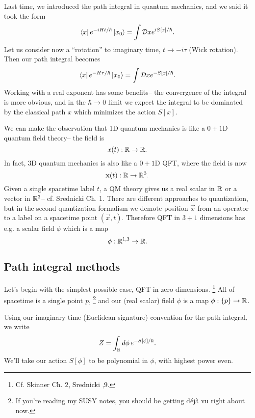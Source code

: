 Last time, we introduced the path integral in quantum mechanics, and we said it took the form
\begin{equation}
    \left< x \right|e^{-iHt/\hbar}\left| x_0 \right>=\int \mathcal{D} x e^{iS[x]/\hbar}.
\end{equation}
Let us consider now a ``rotation'' to imaginary time, $t\to - i\tau$ (Wick rotation). Then our path integral becomes
\begin{equation}
    \left< x \right|e^{-H\tau/\hbar}\left| x_0 \right>=\int \mathcal{D} x e^{-S[x]/\hbar}.
\end{equation}
Working with a real exponent has some benefits-- the convergence of the integral is more obvious, and in the $\hbar \to 0$ limit we expect the integral to be dominated by the classical path $x$ which minimizes the action $S[x].$

We can make the observation that 1D quantum mechanics is like a $0+1$D quantum field theory-- the field is
\begin{equation*}
    x(t): \mathbb{R} \to \mathbb{R}.
\end{equation*}
In fact, 3D quantum mechanics is also like a $0+1$D QFT, where the field is now
\begin{equation*}
    \boldsymbol{\mathbf{x}}(t): \mathbb{R} \to \mathbb{R}^3.
\end{equation*}
Given a single spacetime label $t$, a QM theory gives us a real scalar in $\mathbb{R}$ or a vector in $\mathbb{R}^3$-- cf. Srednicki Ch. 1. There are different approaches to quantization, but in the second quantization formalism we demote position $\vec x$ from an operator to a label on a spacetime point $(\vec x,t)$. Therefore QFT in $3+1$ dimensions has e.g. a scalar field $\phi$ which is a map
\begin{equation*}
    \phi: \mathbb{R}^{1,3}\to \mathbb{R}.
\end{equation*}

\subsection*{Path integral methods}
Let's begin with the simplest possible case, QFT in zero dimensions.%
    \footnote{Cf. Skinner Ch. 2, Srednicki ,9.}
All of spacetime is a single point $p$,%
    \footnote{If you're reading my SUSY notes, you should be getting d\'ej\`a vu right about now.}
and our (real scalar) field $\phi$ is a map $\phi:\{p\}\to\mathbb{R}$.

Using our imaginary time (Euclidean signature) convention for the path integral, we write
\begin{equation}
    Z = \int_{\mathbb{R}} d\phi\, e^{-S[\phi]/\hbar}.
\end{equation}
We'll take our action $S[\phi]$ to be polynomial in $\phi$, with highest power even.

